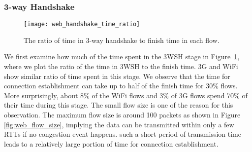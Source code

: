 
\subsubsection{3-way Handshake}

\begin{figure}[th]
\centering
\texttt{[image: web\_handshake\_time\_ratio]}
\caption{The ratio of time in 3-way handshake to finish time in each flow.}
\label{fig:web_handshake_ratio}
\end{figure}

We first examine how much of the time spent in the 3WSH stage in Figure~\ref{fig:web_handshake_ratio}, where we plot the ratio of the time in 3WSH to the finish time. 3G and WiFi show similar ratio of time spent in this stage. We observe that the time for connection establishment can take up to half of the finish time for 30\% flows. More surprisingly, about 8\% of the WiFi flows and 3\% of 3G flows spend 70\% of their time during this stage. The small flow size is one of the reason for this observation. The maximum flow size is around 100 packets as shown in Figure \ref{fig:web_flow_size}, implying the data can be transmitted within only a few RTTs if no congestion event happens. such a short period of transmission time leads to a relatively large portion of time for connection establishment.




